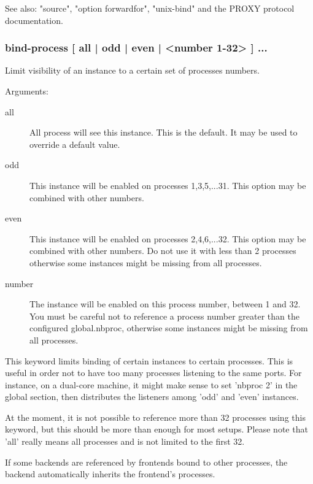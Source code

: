   See also: "source", "option forwardfor", "unix-bind" and the PROXY protocol
             documentation.

\subsubsection[bind-process]{bind-process [ all | odd | even | <number 1-32> ] ...}
  Limit visibility of an instance to a certain set of processes numbers.
  
                                 
  Arguments:
  \begin{description}
  \item[all]   All process will see this instance. This is the default. It
                  may be used to override a default value.

  \item[odd]   This instance will be enabled on processes 1,3,5,...31. This
                  option may be combined with other numbers.

  \item[even]  This instance will be enabled on processes 2,4,6,...32. This
                  option may be combined with other numbers. Do not use it
                  with less than 2 processes otherwise some instances might be
                  missing from all processes.

  \item[number] The instance will be enabled on this process number, between
                  1 and 32. You must be careful not to reference a process
                  number greater than the configured global.nbproc, otherwise
                  some instances might be missing from all processes.
  \end{description}

  This keyword limits binding of certain instances to certain processes. This
  is useful in order not to have too many processes listening to the same
  ports. For instance, on a dual-core machine, it might make sense to set
  'nbproc 2' in the global section, then distributes the listeners among 'odd'
  and 'even' instances.

  At the moment, it is not possible to reference more than 32 processes using
  this keyword, but this should be more than enough for most setups. Please
  note that 'all' really means all processes and is not limited to the first
  32.

  If some backends are referenced by frontends bound to other processes, the
  backend automatically inherits the frontend's processes.

